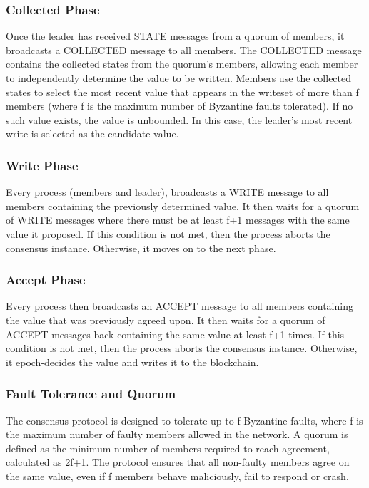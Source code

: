 \documentclass[runningheads]{llncs}
\begin{document}
\subsubsection{Collected Phase}
Once the leader has received STATE messages from a quorum of members, it
broadcasts a COLLECTED message to all members. The COLLECTED message contains
the collected states from the quorum's members, allowing each member to independently
determine the value to be written. Members use the collected states to select
the most recent value that appears in the writeset of more than f members (where
f is the maximum number of Byzantine faults tolerated). If no such value exists,
the value is unbounded. In this case, the leader's most recent write is selected 
as the candidate value.

\subsubsection{Write Phase}
Every process (members and leader), broadcasts a WRITE message to all members containing the
previously determined value. It then waits for a quorum of WRITE messages where there must
be at least f+1 messages with the same value it proposed. If this condition is not met, then the process
aborts the consensus instance. Otherwise, it moves on to the next phase.

\subsubsection{Accept Phase}
Every process then broadcasts an ACCEPT message to all members containing the value that was
previously agreed upon. It then waits for a quorum of ACCEPT messages back
containing the same value at least f+1 times. If this condition is not met, then the process
aborts the consensus instance. Otherwise, it epoch-decides the value and writes it to the blockchain.

\subsubsection{Fault Tolerance and Quorum}
The consensus protocol is designed to tolerate up to f Byzantine faults, where f
is the maximum number of faulty members allowed in the network. A quorum is
defined as the minimum number of members required to reach agreement, calculated
as 2f+1. The protocol
ensures that all non-faulty members agree on the same value, even if f
members behave maliciously, fail to respond or crash.
\end{document}
